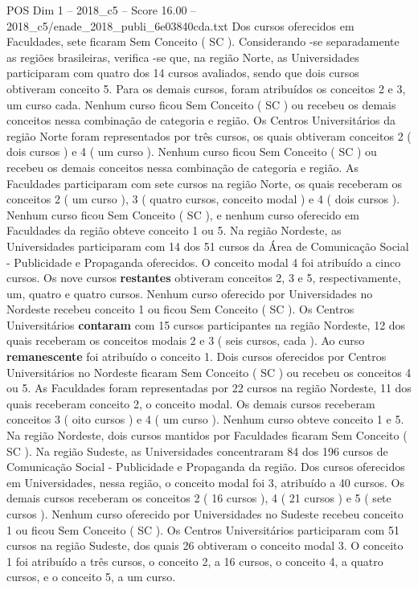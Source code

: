 \begin{textsample}{POS Dim 1 – 2018\_c5 – Score 16.00 – 2018\_c5/enade\_2018\_publi\_6e03840cda.txt}
Dos cursos oferecidos em Faculdades, sete ficaram Sem Conceito ( SC ).
Considerando -se separadamente as regiões brasileiras, verifica -se que, na região Norte, as Universidades participaram com quatro dos 14 cursos avaliados, sendo que dois cursos obtiveram conceito 5.
Para os demais cursos, foram atribuídos os conceitos 2 e 3, um curso cada.
Nenhum curso ficou Sem Conceito ( SC ) ou recebeu os demais conceitos nessa combinação de categoria e região.
Os Centros Universitários da região Norte foram representados por três cursos, os quais obtiveram conceitos 2 ( dois cursos ) e 4 ( um curso ).
Nenhum curso ficou Sem Conceito ( SC ) ou recebeu os demais conceitos nessa combinação de categoria e região.
As Faculdades participaram com sete cursos na região Norte, os quais receberam os conceitos 2 ( um curso ), 3 ( quatro cursos, conceito modal ) e 4 ( dois cursos ).
Nenhum curso ficou Sem Conceito ( SC ), e nenhum curso oferecido em Faculdades da região obteve conceito 1 ou 5.
Na região Nordeste, as Universidades participaram com 14 dos 51 cursos da Área de Comunicação Social - Publicidade e Propaganda oferecidos.
O conceito modal 4 foi atribuído a cinco cursos.
Os nove cursos \textbf{restantes} obtiveram conceitos 2, 3 e 5, respectivamente, um, quatro e quatro cursos.
Nenhum curso oferecido por Universidades no Nordeste recebeu conceito 1 ou ficou Sem Conceito ( SC ).
Os Centros Universitários \textbf{contaram} com 15 cursos participantes na região Nordeste, 12 dos quais receberam os conceitos modais 2 e 3 ( seis cursos, cada ).
Ao curso \textbf{remanescente} foi atribuído o conceito 1.
Dois cursos oferecidos por Centros Universitários no Nordeste ficaram Sem Conceito ( SC ) ou recebeu os conceitos 4 ou 5.
As Faculdades foram representadas por 22 cursos na região Nordeste, 11 dos quais receberam conceito 2, o conceito modal.
Os demais cursos receberam conceitos 3 ( oito cursos ) e 4 ( um curso ).
Nenhum curso obteve conceito 1 e 5.
Na região Nordeste, dois cursos mantidos por Faculdades ficaram Sem Conceito ( SC ).
Na região Sudeste, as Universidades concentraram 84 dos 196 cursos de Comunicação Social - Publicidade e Propaganda da região.
Dos cursos oferecidos em Universidades, nessa região, o conceito modal foi 3, atribuído a 40 cursos.
Os demais cursos receberam os conceitos 2 ( 16 cursos ), 4 ( 21 cursos ) e 5 ( sete cursos ).
Nenhum curso oferecido por Universidades no Sudeste recebeu conceito 1 ou ficou Sem Conceito ( SC ).
Os Centros Universitários participaram com 51 cursos na região Sudeste, dos quais 26 obtiveram o conceito modal 3.
O conceito 1 foi atribuído a três cursos, o conceito 2, a 16 cursos, o conceito 4, a quatro cursos, e o conceito 5, a um curso.

\end{textsample}
